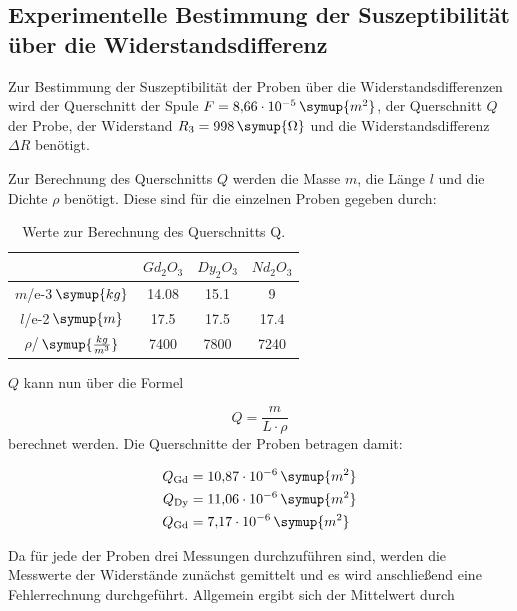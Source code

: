 \subsection{Experimentelle Bestimmung der Suszeptibilität über die Widerstandsdifferenz}
Zur Bestimmung der Suszeptibilität der Proben über die Widerstandsdifferenzen wird der Querschnitt der Spule $F = 8{,}66\cdot10^{-5}\,\symup{m^2}$, der Querschnitt $Q$ der Probe, 
der Widerstand $R_3 = 998\,\symup{\Omega}$ und die Widerstandsdifferenz $\Delta R$ benötigt.

Zur Berechnung des Querschnitts $Q$ werden die Masse $m$, die Länge $l$ und die Dichte $\rho$  benötigt. Diese sind für die einzelnen Proben gegeben durch:

\begin{table}[htbp]
\centering
\caption{Werte zur Berechnung des Querschnitts Q.}
\label{tab:some_data}
\begin{tabular}{S[table-figures-exponent=1] S[table-auto-round, table-format=4.2] S S}
\toprule
 & {$Gd_2O_3 $} & {$Dy_2O_3$} & {$Nd_2O_3$} \\
\midrule
$m$/e-3\,$\symup{kg}$& 14.08 & 15.1 & 9 \\
$l$/e-2\,$\symup{m}$ & 17.5  & 17.5  & 17.4  \\
$\rho$/\,$\symup{\frac{kg}{m^3}}$ & 7400 & 7800 & 7240 \\
\bottomrule
\end{tabular}
\end{table}
$Q$ kann nun über die Formel

\begin{equation*}
Q = \frac{m}{L\cdot\rho}
\end{equation*}
berechnet werden. Die Querschnitte der Proben betragen damit:

\begin{equation*}
\begin{aligned}
Q_{\text{Gd}} &= 10{,}87\cdot10^{-6}\,\symup{m^2} \\
Q_{\text{Dy}} &= 11{,}06\cdot10^{-6}\,\symup{m^2} \\
Q_{\text{Gd}} &= 7{,}17\cdot10^{-6}\,\symup{m^2} \\
\end{aligned}
\end{equation*}

Da für jede der Proben drei Messungen durchzuführen sind, werden die Messwerte der Widerstände zunächst gemittelt und es wird anschließend eine Fehlerrechnung durchgeführt.
Allgemein ergibt sich der Mittelwert durch

